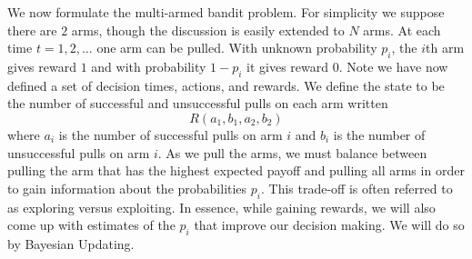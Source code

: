 We now formulate the multi-armed bandit problem.  
For simplicity we suppose there are $2$ arms, though the 
discussion is easily extended to $N$ arms.  
At each time $t= 1,2,\ldots$ one arm can be pulled.  
With unknown probability $p_i$, the $i$th arm gives 
reward $1$ and with probability $1-p_i$ it gives reward $0$.  
Note we have now defined a set of decision times, actions, and rewards. 
We define the state to be the number of successful and unsuccessful 
pulls on each arm written
\begin{equation}\label{state}
R(a_1,b_1,a_2,b_2)
\end{equation}
where $a_i$ is the number of successful pulls on arm $i$ and $b_i$ 
is the number of unsuccessful pulls on arm $i$.
As we pull the arms, we must balance between pulling the arm that has 
the highest expected payoff and pulling all arms in order to gain 
information about the probabilities $p_i$.  
This trade-off is often referred to as exploring versus exploiting.  
In essence, while gaining rewards, we will also come up with 
estimates of the $p_i$ that improve our decision making.  
We will do so by Bayesian Updating.

